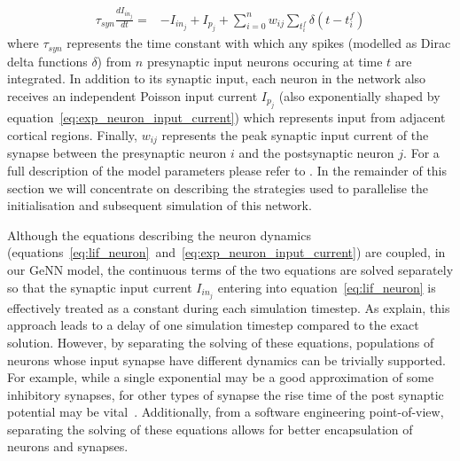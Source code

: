 \documentclass[utf8]{frontiersSCNS} %
\begin{document}
%
\begin{align}
    \tau_{syn} \frac{dI_{{in}_{j}}}{dt} = & -I_{{in}_{j}} + I_{p_{j}} + \sum_{i=0}^{n} w_{ij} \sum_{t_{i}^{f}}  \delta(t - t_{i}^{f})\label{eq:exp_neuron_input_current}
\end{align}
%
where $\tau_{syn}$ represents the time constant with which any spikes (modelled as Dirac delta functions $\delta$) from $n$ presynaptic input neurons occuring at time $t$ are integrated.
In addition to its synaptic input, each neuron in the network also receives an independent Poisson input current $I_{p_{j}}$ (also exponentially shaped by equation~\ref{eq:exp_neuron_input_current}) which represents input from adjacent cortical regions.
Finally, $w_{ij}$ represents the peak synaptic input current of the synapse between the presynaptic neuron $i$ and the postsynaptic neuron $j$.
For a full description of the model parameters please refer to \citet[tables 4 and 5]{Potjans2012}.
In the remainder of this section we will concentrate on describing the strategies used to parallelise the initialisation and subsequent simulation of this network.

Although the equations describing the neuron dynamics (equations~\ref{eq:lif_neuron}~and~\ref{eq:exp_neuron_input_current}) are coupled, in our GeNN model, the continuous terms of the two equations are solved separately so that the synaptic input current $I_{{in}_{j}}$ entering into equation~\ref{eq:lif_neuron} is effectively treated as a constant during each simulation timestep.
As \citet{Rotter1999} explain, this approach leads to a delay of one simulation timestep compared to the exact solution.
However, by separating the solving of these equations, populations of neurons whose input synapse have different dynamics can be trivially supported.
For example, while a single exponential may be a good approximation of some inhibitory synapses, for other types of synapse the rise time of the post synaptic potential may be vital~\citep{VanVreeswijk1994}.
Additionally, from a software engineering point-of-view, separating the solving of these equations allows for better encapsulation of neurons and synapses.
\end{document}
